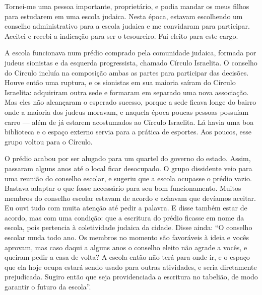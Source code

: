 Tornei-me uma pessoa importante, proprietário, e podia mandar os meus
filhos para estudarem em uma escola judaica. Nesta época, estavam
escolhendo um conselho administrativo para a escola judaica e me
convidaram para participar. Aceitei e recebi a indicação para ser o
tesoureiro. Fui eleito para este cargo. 


A escola funcionava num prédio comprado pela comunidade judaica, formada por 
judeus sionistas e da esquerda progressista, chamado
Círculo Israelita. O conselho do Círculo incluía na composição ambas
as partes para participar das decisões. Houve então uma ruptura, e os
sionistas em sua maioria saíram do Círculo Israelita: adquiriram outra
sede e formaram em separado uma nova associação. Mas eles não alcançaram
o esperado sucesso, porque a sede ficava longe do bairro onde a maioria
dos judeus moravam, e naquela época poucas pessoas possuíam carro --- além de já
estarem acostumados ao Círculo Israelita. Lá havia uma boa
biblioteca e o espaço externo servia para a prática de
esportes. Aos poucos, esse grupo voltou para o Círculo.

O prédio acabou por ser alugado para um quartel do governo do estado. Assim, passaram
alguns anos até o local ficar desocupado. O grupo dissidente veio para
uma reunião do conselho escolar, e sugeriu que a escola 
ocupasse o prédio vazio. Bastava adaptar o que fosse necessário
para seu bom funcionamento. Muitos membros do conselho escolar
estavam de acordo e achavam que devíamos aceitar. Eu ouvi
tudo com muita atenção até pedir a palavra. E disse também estar de acordo, mas com uma condição: que a escritura do prédio ficasse em nome da escola, pois pertencia à 
coletividade judaica da cidade. Disse ainda: ``O conselho escolar muda todo ano. Os membros no momento são favoráveis à ideia e vocês aprovam, mas caso daqui a alguns anos o conselho eleito não agrade a vocês, e queiram pedir a casa de volta? A escola então não terá para onde ir, e o espaço que ela hoje ocupa estará sendo usado para outras atividades, e seria diretamente 
prejudicada. Sugiro então que seja providenciada a escritura no tabelião,
de modo garantir o futuro da escola''.

